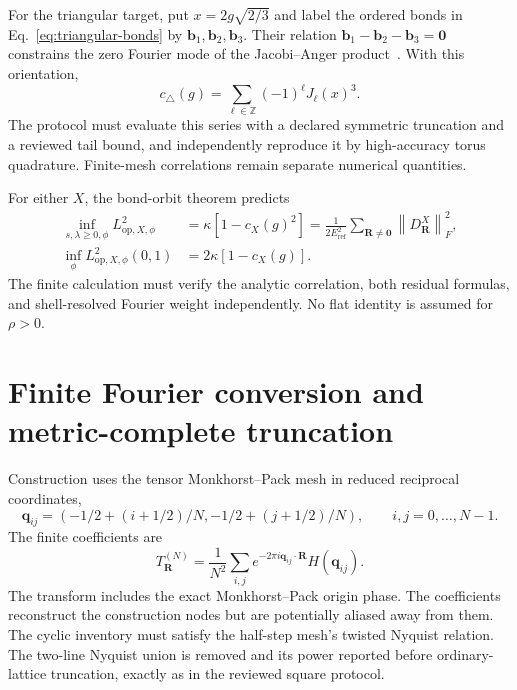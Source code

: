 \documentclass[11pt]{article}
\newcommand{\norm}[1]{\left\lVert #1\right\rVert}
\newcommand{\Z}{\mathbb Z}
\begin{document}
For the triangular target, put $x=2g\sqrt{2/3}$ and label the ordered bonds in
Eq.~\eqref{eq:triangular-bonds} by $\mathbf b_1,\mathbf b_2,\mathbf b_3$.  Their
relation $\mathbf b_1-\mathbf b_2-\mathbf b_3=\mathbf0$ constrains the zero Fourier
mode of the Jacobi--Anger product~\cite{dlmf1012}.  With this orientation,
\begin{equation}
 c_{\triangle}(g)
 =\sum_{\ell\in\Z}(-1)^\ell J_\ell(x)^3.
 \label{eq:triangular-comparator}
\end{equation}
The protocol must evaluate this series with a declared symmetric truncation and a
reviewed tail bound, and independently reproduce it by high-accuracy torus quadrature.
Finite-mesh correlations remain separate numerical quantities.

For either $X$, the bond-orbit theorem predicts
\begin{align}
 \inf_{s,\lambda\ge0,\phi}L_{\mathrm{op},X,\phi}^2
 &=\kappa[1-c_X(g)^2]
 =\frac{1}{2E_{\mathrm{ref}}^2}\sum_{\mathbf R\ne\mathbf0}
   \norm{D_{\mathbf R}^{X}}_F^2,
 \label{eq:flat-tail}\\
 \inf_\phi L_{\mathrm{op},X,\phi}^2(0,1)
 &=2\kappa[1-c_X(g)].
\end{align}
The finite calculation must verify the analytic correlation, both residual formulas,
and shell-resolved Fourier weight independently.  No flat identity is assumed for
$\rho>0$.

\section{Finite Fourier conversion and metric-complete truncation}

Construction uses the tensor Monkhorst--Pack mesh in reduced reciprocal coordinates,
\begin{equation}
 \mathbf q_{ij}=(-1/2+(i+1/2)/N,-1/2+(j+1/2)/N),
 \qquad i,j=0,\ldots,N-1.
\end{equation}
The finite coefficients are
\begin{equation}
 T_{\mathbf R}^{(N)}=\frac1{N^2}\sum_{i,j}
 e^{-2\pi i\mathbf q_{ij}\cdot\mathbf R}H(\mathbf q_{ij}).
\end{equation}
The transform includes the exact Monkhorst--Pack origin phase.  The coefficients
reconstruct the construction nodes but are potentially aliased away from them.  The
cyclic inventory must satisfy the half-step mesh's twisted Nyquist relation.  The
two-line Nyquist union is removed and its power reported before ordinary-lattice
truncation, exactly as in the reviewed square protocol.
\end{document}
